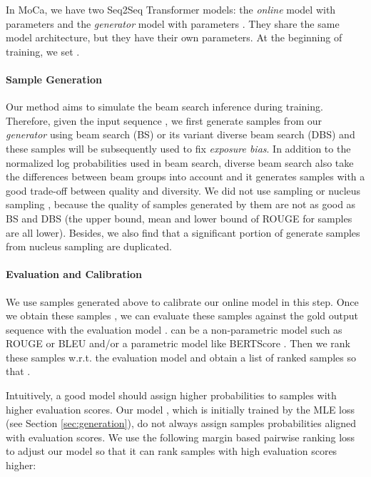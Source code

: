 \documentclass{article}
\begin{document}
In MoCa, we have two Seq2Seq Transformer models: the \emph{online} model  with parameters  and the \mbox{\emph{generator}} model  with parameters . They share the same model architecture, but they have their own parameters. At the beginning of training, we set .

\paragraph{Sample Generation} Our method aims to simulate the beam search inference during training. Therefore, given the input sequence , we first generate  samples  from our \mbox{\emph{generator}}  using beam search (BS) or its variant diverse beam search (DBS) \cite{vijayakumar:2016:arxiv} and these samples will be subsequently used to fix \emph{exposure bias}. In addition to the normalized log probabilities used in beam search, diverse beam search also take the differences between beam groups into account and it generates samples with a good trade-off between quality and diversity. We did not use sampling or nucleus sampling \cite{holtzman:2019:arxiv}, because the quality of samples generated by them are not as good as BS and DBS (the upper bound, mean and lower bound of ROUGE for samples are all lower). Besides, we also find that a significant portion of generate samples from nucleus sampling are duplicated. 

\paragraph{Evaluation and Calibration} We use samples generated above to calibrate our online model  in this step. Once we obtain these samples , we can evaluate these samples against the gold output sequence  with the evaluation model .  can be a non-parametric model such as ROUGE \cite{lin-2004-rouge} or BLEU \cite{papineni-etal-2002-bleu} and/or a parametric model like BERTScore \cite{zhang2019bertscore}. Then we rank these samples w.r.t. the evaluation model and obtain a list of ranked samples  so that .

Intuitively, a good model should assign higher probabilities to samples with higher evaluation scores. Our model , which is initially trained by the MLE loss (see Section \ref{sec:generation}), do not always assign samples probabilities aligned with evaluation scores. We use the following margin based pairwise ranking loss \cite{hopkins2011tuning,zhong-etal-2020-extractive} to adjust our model so that it can rank samples with high evaluation scores higher:
\end{document}
